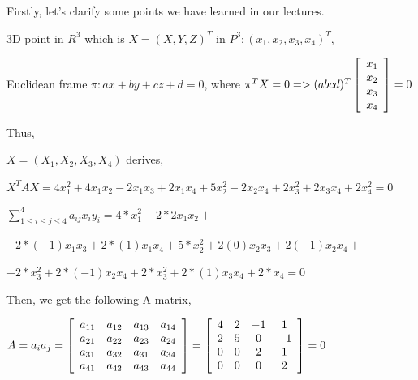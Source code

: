 \documentclass[]{article}
\begin{document}
Firstly, let's clarify some points we have learned in our lectures. 

\centerline {
	3D point in $R^3$ which is $X = (X, Y, Z)^T$ in $P^3 : (x_1, x_2, x_3, x_4)^T$,
}

\centerline {
	Euclidean frame $\pi : ax + by + cz +d = 0$, where
	$\pi^TX = 0 => (a b c d) ^T\left[ {\begin{array}{*{20}c}
		x_1 \\
		x_2 \\ 
		x_3 \\
		x_4  
		\end{array} } \right] = 0$	
}

Thus, 

\centerline {
	$X = (X_1, X_2, X_3, X_4)$ derives, 
}

\vspace{0.5em}

\centerline {
		$X^TAX = 4x_1^2 + 4x_1x_2 - 2x_1x_3 + 2x_1x_4 + 5x_2^2 - 2x_2x_4 + 2x_3^2 + 2x_3x_4 + 2x_4^2 = 0$
}

\vspace{0.5em}

\centerline {
	$\sum_{1 \leq i \leq  j \leq 4 }^{4} a_{ij}x_iy_i  = 4*x_1^2 + 2*2x_1x_2 + $ 
}

\vspace{0.5em}

\centerline {
	$+ 2 * (-1)x_1x_3 + 2* (1)x_1x_4 + 5*x_2^2 + 2(0)x_2x_3 + 2(-1)x_2x_4 +$
}

\vspace{0.5em}

\centerline {
	$+  2*x_3^2 + 2*(-1)x_2x_4 + 2* x_3^2 + 2*(1)x_3x_4 + 2*x_4 = 0$
}

\vspace{0.5em}

Then, we get the following A matrix,

\vspace{0.5em}

\centerline {
	$A = a_ia_j = \left[ {\begin{array}{*{20}c}
		a_{11} & a_{12} & a_{13} & a_{14} \\
		a_{21} & a_{22} & a_{23} & a_{24} \\ 
		a_{31} & a_{32} & a_{31} &  a_{34} \\
		a_{41} & a_{42} & a_{43} & a_{44}  
		\end{array} } \right] =  \left[ {\begin{array}{*{20}c}
		4 & 2 & -1 & 1 \\
		2 & 5 & 0 & -1 \\ 
		0 & 0 & 2 &  1 \\
		0 & 0 & 0 & 2  
		\end{array} } \right] = 0 $ 
}
\end{document}
